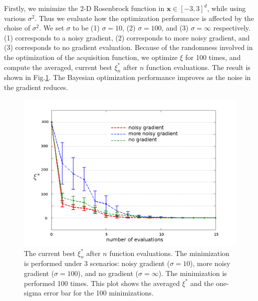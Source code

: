 \documentclass[a4paper,onecolumn]{article}
\theoremstyle{remark}
\begin{document}
Firstly, we minimize the 2-D Rosenbrock function in $\mathbf{x}\in [-3,3]^d$, while
using various $\sigma^2$. Thus we evaluate 
how the optimization performance is affected by the choise of $\sigma^2$.
We set $\sigma$ to be (1) $\sigma=10$, (2) $\sigma=100$, and (3) $\sigma=\infty$
respectively. (1) corresponds to a noisy gradient, (2) corresponds to more noisy gradient,
and (3) corresponds to no gradient evaluation. Because of the randomness involved in the 
optimization of the acquisition function, we optimize $\xi$ for 100 times, and compute
the averaged, current best $\xi^*_n$ after $n$ function evaluations.
The result is shown in Fig.\ref{fig:compare_ratio}. The Bayesian optimization 
performance improves as the noise in the gradient reduces.\\
\begin{figure}\begin{center}
    \includegraphics[width=13cm]{compare_ratio.png}
    \caption{The current best $\xi^*_n$ after $n$ function evaluations. The minimization is 
    performed under 3 scenarios: noisy gradient ($\sigma=10$), more noisy gradient ($\sigma=100$), 
    and no gradient ($\sigma=\infty$). The minimization is performed 100 times. This plot
    shows the averaged 
    $\xi^*$ and the one-sigma error bar for the 100 minimizations.}
    \label{fig:compare_ratio}
\end{center}
\end{figure}
\end{document}
